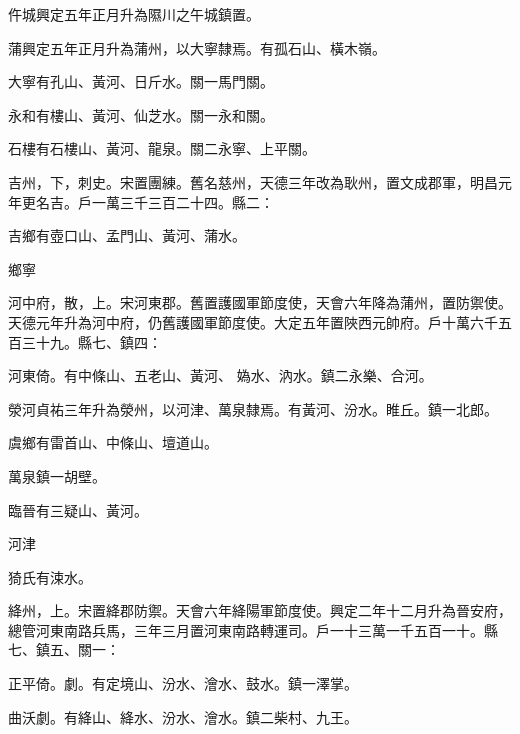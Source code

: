 \begin{pinyinscope}
 仵城興定五年正月升為隰川之午城鎮置。



 蒲興定五年正月升為蒲州，以大寧隸焉。有孤石山、橫木嶺。



 大寧有孔山、黃河、日斤水。關一馬門關。



 永和有樓山、黃河、仙芝水。關一永和關。



 石樓有石樓山、黃河、龍泉。關二永寧、上平關。



 吉州，下，刺史。宋置團練。舊名慈州，天德三年改為耿州，置文成郡軍，明昌元年更名吉。戶一萬三千三百二十四。縣二：



 吉鄉有壺口山、孟門山、黃河、蒲水。



 鄉寧



 河中府，散，上。宋河東郡。舊置護國軍節度使，天會六年降為蒲州，置防禦使。天德元年升為河中府，仍舊護國軍節度使。大定五年置陜西元帥府。戶十萬六千五百三十九。縣七、鎮四：



 河東倚。有中條山、五老山、黃河、
 媯水、汭水。鎮二永樂、合河。



 滎河貞祐三年升為滎州，以河津、萬泉隸焉。有黃河、汾水。睢丘。鎮一北郎。



 虞鄉有雷首山、中條山、壇道山。



 萬泉鎮一胡壁。



 臨晉有三疑山、黃河。



 河津



 猗氏有涑水。



 絳州，上。宋置絳郡防禦。天會六年絳陽軍節度使。興定二年十二月升為晉安府，總管河東南路兵馬，三年三月置河東南路轉運司。戶一十三萬一千五百一十。縣七、鎮五、關一：



 正平倚。劇。有定境山、汾水、澮水、鼓水。鎮一澤掌。



 曲沃劇。有絳山、絳水、汾水、澮水。鎮二柴村、九王。




\end{pinyinscope}
